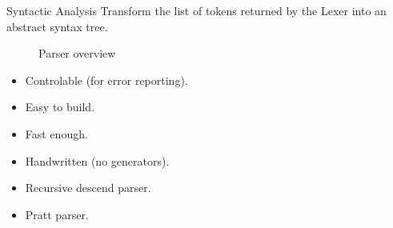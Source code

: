 \begin{slide}
    \begin{block}{Syntactic Analysis}
        Transform the list of tokens returned by the Lexer into an abstract syntax tree.
    \end{block}
    \vfill
    \begin{figure}[H]
        \centering
        \caption{Parser overview}
    \end{figure}
\end{slide}
\begin{slide}
    \begin{itemize}
        \item Controlable (for error reporting).
        \item Easy to build.
        \item Fast enough.
        \item Handwritten (no generators).
    \end{itemize}
    \begin{itemize}
        \item Recursive descend parser.
        \item Pratt parser.
    \end{itemize}
\end{slide}

